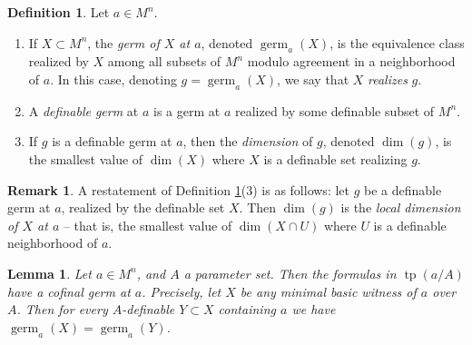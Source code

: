 \documentclass{amsart}
\newtheorem{lemma}[theorem]{Lemma}
\theoremstyle{definition}
\newtheorem{definition}[theorem]{Definition}
\newtheorem{remark}[theorem]{Remark}
\begin{document}
\begin{definition}\label{D: germ}
    Let $a\in M^n$.
    \begin{enumerate}
        \item If $X\subset M^n$, the \textit{germ of $X$ at $a$}, denoted $\operatorname{germ}_a(X)$, is the equivalence class realized by $X$ among all subsets of $M^n$ modulo agreement in a neighborhood of $a$. In this case, denoting $g=\operatorname{germ}_a(X)$, we say that $X$ \textit{realizes} $g$.
        \item A \textit{definable germ} at $a$ is a germ at $a$ realized by some definable subset of $M^n$.
        \item If $g$ is a definable germ at $a$, then the \textit{dimension} of $g$, denoted $\dim(g)$, is the smallest value of $\dim(X)$ where $X$ is a definable set realizing $g$.
        \end{enumerate}
\end{definition}

\begin{remark} A restatement of Definition \ref{D: germ}(3) is as follows: let $g$ be a definable germ at $a$, realized by the definable set $X$. Then $\dim(g)$ is the \textit{local dimension of $X$ at $a$} -- that is, the smallest value of $\dim(X\cap U)$ where $U$ is a definable neighborhood of $a$.
\end{remark}

\begin{lemma}\label{L: germs exist} Let $a\in M^n$, and $A$ a parameter set. Then the formulas in $\operatorname{tp}(a/A)$ have a cofinal germ at $a$. Precisely, let $X$ be any minimal basic witness of $a$ over $A$. Then for every $A$-definable $Y\subset X$ containing $a$ we have $\operatorname{germ}_a(X)=\operatorname{germ}_a(Y)$. 
\end{lemma}
\end{document}
